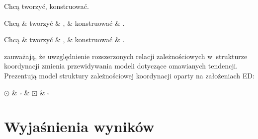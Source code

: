 \begin{exe}
\ex \label{tworzyć+konstruować}
Chcą tworzyć, konstruować.
 
\ex \label{UD}
\begin{dependency}[baseline=-\the\dimexpr\fontdimen22\textfont2\relax]
\begin{deptext}[column sep=1em]
Chcą \& tworzyć \& , \& konstruować \& .  \\ 
\end{deptext}
\end{dependency}

\ex \label{ED}
\begin{dependency}[baseline=-\the\dimexpr\fontdimen22\textfont2\relax]
\begin{deptext}[column sep=1em]
Chcą \& tworzyć \& , \& konstruować \& .  \\ 
\end{deptext}
\end{dependency}
\citep{przepiorkowski2018lexical}
\end{exe}

\cite{przepiorkowski2023conjunct} zauważają, że uwzględnienie rozszerzonych relacji zależnościowych w~strukturze koordynacji zmienia przewidywania modeli dotyczące omawianych tendencji. Prezentują model struktury zależnościowej koordynacji oparty na założeniach ED:

\begin{exe}
\ex \label{ED-model}
\begin{dependency}[theme = simple, edge unit distance=0.5ex, baseline=-\the\dimexpr\fontdimen22\textfont2\relax]
        \begin{deptext}
        $\odot$ \& $\square$ \& $\boxdot$ \& $\square$\\
            \end{deptext}
        \end{dependency}
\end{exe}





\section{Wyjaśnienia wyników}

